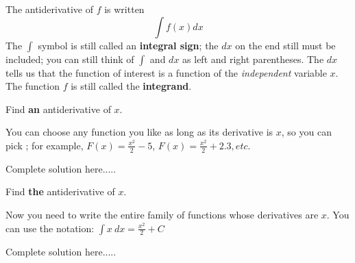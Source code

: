 \begin{tcolorbox}[title = {Notation for the antiderivative:}]
The antiderivative of $f$ is written
$$\int f(x) dx$$
The $\int$ symbol is still called an \textbf{integral sign}; the $dx$ on the end still must be included; you can still think of $\int$ and $dx$ as left and right parentheses. The $dx$ tells us that the function of interest is a function of the \emph{independent} variable $x$. The function $f$ is still called the \textbf{integrand}.
\end{tcolorbox}

\begin{example}
Find \textbf{an} antiderivative of $x$.
    \begin{sol}
    You can choose any function you like as long as its derivative is $x$, so you can pick ; for example, $F(x)=\displaystyle\frac{x^2}{2}-5$, $F(x)=\displaystyle\frac{x^2}{2}+2.3, etc.$ 
    \end{sol}
    \begin{solL}
    Complete solution here.....
    
    \end{solL}
    
\end{example}
\begin{example}
Find \textbf{the} antiderivative of $x$. 
    \begin{sol}
    Now you need to write the entire family of functions whose derivatives are $x$. You can use the notation: $\displaystyle\int x \  dx=\displaystyle\frac{x^2}{2}+C$ 
    \end{sol}
    \begin{solL}
    Complete solution here.....
    
    \end{solL}
    
\end{example}
